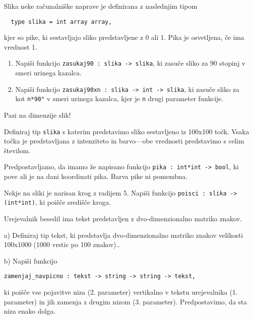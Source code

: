\begin{ex}
  Slika neke ra\v cunalni\v ske naprave je definirana z naslednjim
  tipom

  \begin{verbatim}
  type slika = int array array,
  \end{verbatim}

  kjer so pike, ki sestavljajo sliko predstavljene z 0 ali 1. Pika je
  osvetljena, \v ce ima vrednost 1.

  \begin{enumerate}[label=(\roman*)]
  \item Napi\v si funkcijo \texttt{zasukaj90 : slika -> slika}, ki
    zasu\v ce sliko za 90 stopinj v smeri urinega kazalca.

  \item Napi\v si funkcijo \texttt{zasukaj90xn : slika -> int ->
      slika}, ki zasu\v ce sliko za kot \texttt{n*90°} v smeri urinega
    kazalca, kjer je \texttt{n} drugi parameter funkcije.
  \end{enumerate}

  Pazi na dimenzije slik!


\end{ex} 
\begin{ex}
  Definiraj tip \texttt{slika} s katerim predstavimo sliko sestavljeno
  iz 100x100 to\v ck. Vsaka to\v cka je predstavljana z intenziteto in
  barvo---obe vrednosti predstavimo s celim \v stevilom.

  Predpostavljamo, da imamo \v ze napisano funkcijo \texttt{pika :
    int*int -> bool}, ki pove ali je na dani koordinati pika. Barva
  pike ni pomembna.

  Nekje na sliki je narisan krog z radijem 5. Napi\v si funkcijo
  \texttt{poisci : slika -> (int*int)}, ki poi\v s\v ce sredi\v s\v ce
  kroga.


\end{ex} 
\begin{ex}
  Urejevalnik besedil ima tekst predstavljen z dvo-dimenzionalno
  matriko znakov.

  a) Definiraj tip tekst, ki predstavlja dvo-dimenzionalno matriko
  znakov velikosti 100x1000 (1000 vrstic po 100 znakov)..

  b) Napi\v si funkcijo

\begin{verbatim}
zamenjaj_navpicno : tekst -> string -> string -> tekst, 
\end{verbatim}

  ki poi\v s\v ce vse pojavitve niza (2. parameter) vertikalno v
  tekstu urejevalnika (1. parameter) in jih zamenja z drugim nizom
  (3. parameter). Predpostavimo, da sta niza enako dolga.


\end{ex} 

